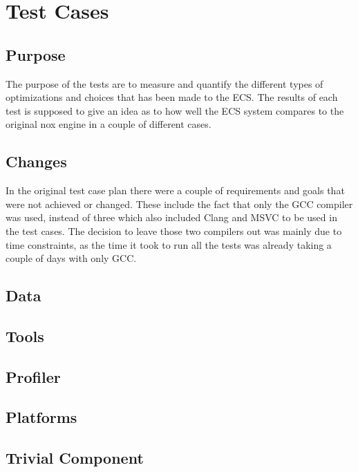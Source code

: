 \section{Test Cases}

\subsection{Purpose}
The purpose of the tests are to measure and quantify the different types of optimizations and choices that has been made to the ECS.
The results of each test is supposed to give an idea as to how well the ECS system compares to the original nox engine in a couple of different cases.

\subsection{Changes}
In the original test case plan there were a couple of requirements and goals that were not achieved or changed.
These include the fact that only the GCC compiler was used, instead of three which also included Clang and MSVC to be used in the test cases.
The decision to leave those two compilers out was mainly due to time constraints, as the time it took to run all the tests was already taking a couple of days with only GCC.

\subsection{Data}




\subsection{Tools}




\subsection{Profiler}

\subsection{Platforms}

\subsection{Trivial Component}

